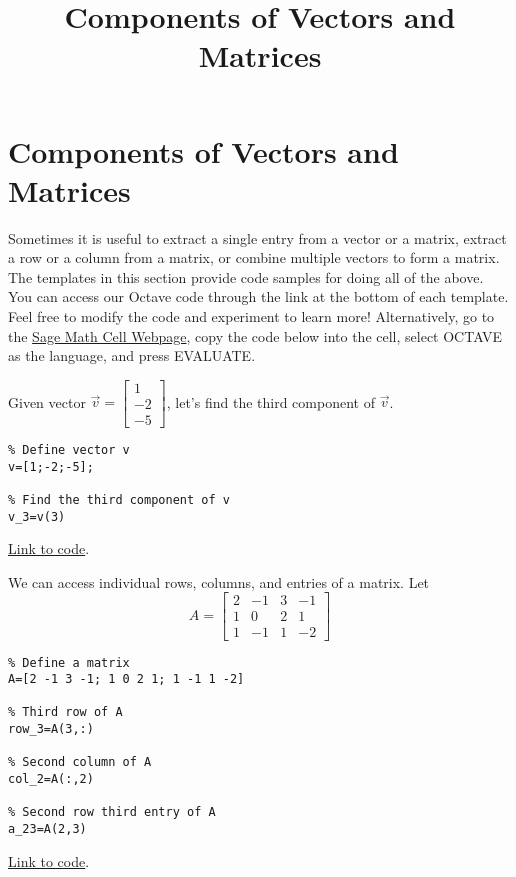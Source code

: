 \documentclass{ximera}
\title{Components of Vectors and Matrices} \license{CC BY-NC-SA 4.0}
\begin{document}
\begin{abstract}
\end{abstract}
\maketitle
\section*{Components of Vectors and Matrices}

Sometimes it is useful to extract a single entry from a vector or a matrix, extract a row or a column from a matrix, or combine multiple vectors to form a matrix.  The templates in this section provide code samples for doing all of the above. You can access our Octave code through the link at the bottom of each template.  Feel free to modify the code and experiment to learn more!  Alternatively, go to the \href{https://sagecell.sagemath.org/}{Sage Math Cell Webpage}, copy the code below into the cell, select OCTAVE as the language, and press EVALUATE.  

\begin{template}\label{temp:vectorComp}
    Given vector $\vec{v}=\begin{bmatrix}1\\-2\\-5\end{bmatrix}$, let's find the third component of $\vec{v}$.
\begin{verbatim}
% Define vector v
v=[1;-2;-5];

% Find the third component of v
v_3=v(3)
\end{verbatim}

    \href{https://sagecell.sagemath.org/?z=eJxTVXBJTcvMS1UoS00uyS9SKOPlKrONNrTWNbLWNY215uXi5VJVcMvMS1EoyUgF4syiFIXk_NyC_LzUvBKF_DSwhnhj2zINY00AVTYWYw==&lang=octave&interacts=eJyLjgUAARUAuQ==}{Link to code}.
\end{template}

\begin{template}\label{temp:matrixRowColEntry}
    We can access individual rows, columns, and entries of a matrix.  Let $$A=\begin{bmatrix}2 & -1 & 3 & -1\\1 & 0 & 2 & 1\\1 & -1 & 1 & -2\end{bmatrix}$$
\begin{verbatim}
% Define a matrix 
A=[2 -1 3 -1; 1 0 2 1; 1 -1 1 -2]

% Third row of A
row_3=A(3,:)

% Second column of A
col_2=A(:,2)

% Second row third entry of A
a_23=A(2,3)   
\end{verbatim}
\href{https://sagecell.sagemath.org/?z=eJxVjEEKwjAURPeB3GE2BQsR7M-u0kXAG9SdSAhtigGbQIhYb-9v7cbNMDM8XoWLn0L0cJhdyWGBFKa7EY4NNMcZDU4gbIU_DrpLIUWF6yPkETm9kSYYKbhZ3ZmDVm39I3o_pDhiSM_XHHeKhyWmWkX_1Coqm9LHkj877iytTlK6_gIqSCuZ&lang=octave&interacts=eJyLjgUAARUAuQ==}{Link to code}.
\end{template}
\end{document}
